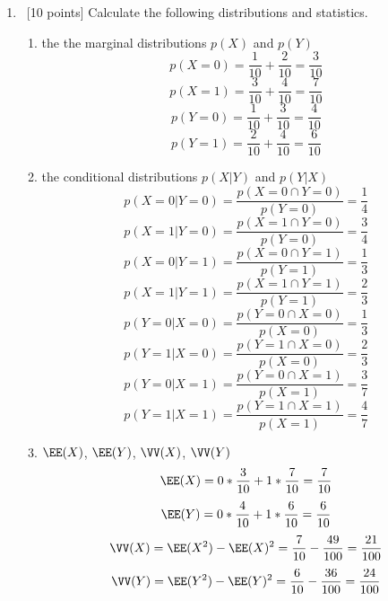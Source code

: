 \documentclass[12pt, fullpage,letterpaper]{article}
\begin{document}
\begin{enumerate}
        \begin{enumerate}
            \item~[10 points] Calculate the following distributions and statistics. 
            \begin{enumerate}
            \item the the marginal distributions $p(X)$ and $p(Y)$\newline
            \[p(X = 0) = \frac{1}{10} + \frac{2}{10} = \frac{3}{10}\]\newline
            \[p(X = 1) = \frac{3}{10} + \frac{4}{10} = \frac{7}{10}\]\newline
            \[p(Y = 0) = \frac{1}{10} + \frac{3}{10} = \frac{4}{10}\]\newline
            \[p(Y = 1) = \frac{2}{10} + \frac{4}{10} = \frac{6}{10}\]
            \item the conditional distributions $p(X|Y)$ and $p(Y|X)$
            \[p(X = 0|Y = 0) = \frac{p(X = 0 \cap Y = 0)}{p(Y = 0)} = \frac{1}{4}\]\newline
            \[p(X = 1|Y = 0) = \frac{p(X = 1 \cap Y = 0)}{p(Y = 0)} = \frac{3}{4}\]\newline
            \[p(X = 0|Y = 1) = \frac{p(X = 0 \cap Y = 1)}{p(Y = 1)} = \frac{1}{3}\]\newline
            \[p(X = 1|Y = 1) = \frac{p(X = 1 \cap Y = 1)}{p(Y = 1)} = \frac{2}{3}\]\newline
            \[p(Y = 0|X = 0) = \frac{p(Y = 0 \cap X = 0)}{p(X = 0)} = \frac{1}{3}\]\newline
            \[p(Y = 1|X = 0) = \frac{p(Y = 1 \cap X = 0)}{p(X = 0)} = \frac{2}{3}\]\newline
            \[p(Y = 0|X = 1) = \frac{p(Y = 0 \cap X = 1)}{p(X = 1)} = \frac{3}{7}\]\newline
            \[p(Y = 1|X = 1) = \frac{p(Y = 1 \cap X = 1)}{p(X = 1)} = \frac{4}{7}\]\newline
            \item $\EE(X)$, $\EE(Y)$, $\VV(X)$, $\VV(Y)$
            \[\EE(X) = 0*\frac{3}{10} + 1*\frac{7}{10} = \frac{7}{10}\]\newline
            \[\EE(Y) = 0*\frac{4}{10} + 1*\frac{6}{10} = \frac{6}{10}\]\newline
            \[\VV(X) = \EE(X^2) - \EE(X)^2 = \frac{7}{10} - \frac{49}{100} = \frac{21}{100}\]\newline
            \[\VV(Y) = \EE(Y^2) - \EE(Y)^2 = \frac{6}{10} - \frac{36}{100} = \frac{24}{100}\]\newline

\end{enumerate}
\end{enumerate}
\end{enumerate}
\end{document}
